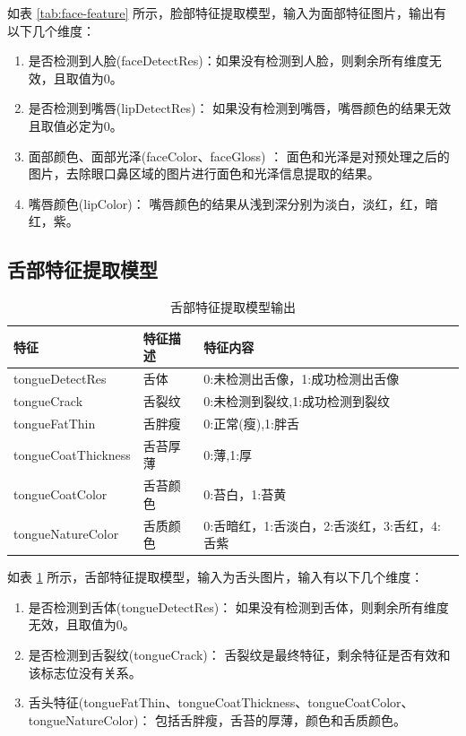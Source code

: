 如表 \ref{tab:face-feature} 所示，脸部特征提取模型，输入为面部特征图片，输出有以下几个维度：

\begin{enumerate}
    \item 是否检测到人脸(faceDetectRes)：如果没有检测到人脸，则剩余所有维度无效，且取值为0。

    \item 是否检测到嘴唇(lipDetectRes)： 如果没有检测到嘴唇，嘴唇颜色的结果无效且取值必定为0。

    \item 面部颜色、面部光泽(faceColor、faceGloss) ： 面色和光泽是对预处理之后的图片，去除眼口鼻区域的图片进行面色和光泽信息提取的结果。

    \item 嘴唇颜色(lipColor)： 嘴唇颜色的结果从浅到深分别为淡白，淡红，红，暗红，紫。
\end{enumerate}


\subsection{舌部特征提取模型}

\begin{table}[h]
    \centering
    \begin{tabular}{lll}
        \toprule
        特征 & 特征描述 & 特征内容 \\ 
        \midrule
        tongueDetectRes & 舌体 & 0:未检测出舌像，1:成功检测出舌像 \\
        tongueCrack & 舌裂纹 & 0:未检测到裂纹,1:成功检测到裂纹 \\ 
        tongueFatThin & 舌胖瘦 & 0:正常(瘦),1:胖舌 \\
        tongueCoatThickness & 舌苔厚薄 & 0:薄,1:厚 \\
        tongueCoatColor & 舌苔颜色 & 0:苔白，1:苔黄 \\
        tongueNatureColor & 舌质颜色 & 0:舌暗红，1:舌淡白，2:舌淡红，3:舌红，4:舌紫\\
        \bottomrule
    \end{tabular}

    \caption{舌部特征提取模型输出}
    \label{tab:tongue-feature}
\end{table}

如表 \ref{tab:tongue-feature} 所示，舌部特征提取模型，输入为舌头图片，输入有以下几个维度：

\begin{enumerate}
    \item 是否检测到舌体(tongueDetectRes)： 如果没有检测到舌体，则剩余所有维度无效，且取值为0。

    \item 是否检测到舌裂纹(tongueCrack)： 舌裂纹是最终特征，剩余特征是否有效和该标志位没有关系。

    \item 舌头特征(tongueFatThin、tongueCoatThickness、tongueCoatColor、tongueNatureColor)： 包括舌胖瘦，舌苔的厚薄，颜色和舌质颜色。

\end{enumerate}

